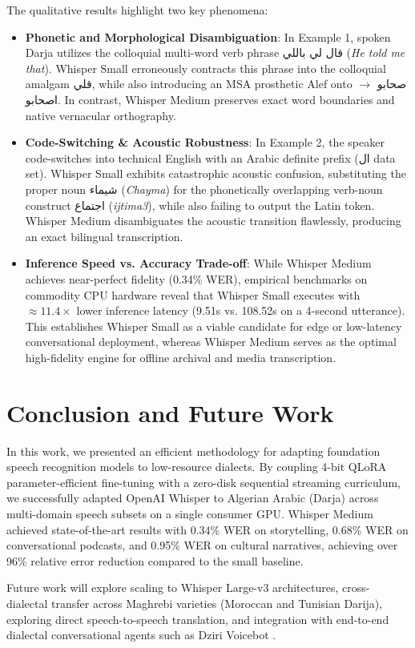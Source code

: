 \documentclass[11pt,a4paper]{article}
\providecommand{\textarabic}[1]{\foreignlanguage{arabic}{#1}}
\begin{document}
The qualitative results highlight two key phenomena:
\begin{itemize}[leftmargin=*]
    \item \textbf{Phonetic and Morphological Disambiguation}: In Example 1, spoken Darja utilizes the colloquial multi-word verb phrase \textarabic{قال لي باللي} (\textit{He told me that}). Whisper Small erroneously contracts this phrase into the colloquial amalgam \textarabic{قلي}, while also introducing an MSA prosthetic Alef onto \textarabic{صحابو} $\rightarrow$ \textarabic{اصحابو}. In contrast, Whisper Medium preserves exact word boundaries and native vernacular orthography.
    \item \textbf{Code-Switching \& Acoustic Robustness}: In Example 2, the speaker code-switches into technical English with an Arabic definite prefix (\textarabic{ال data set}). Whisper Small exhibits catastrophic acoustic confusion, substituting the proper noun \textarabic{شيماء} (\textit{Chayma}) for the phonetically overlapping verb-noun construct \textarabic{اجتماع} (\textit{ijtima3}), while also failing to output the Latin token. Whisper Medium disambiguates the acoustic transition flawlessly, producing an exact bilingual transcription.
    \item \textbf{Inference Speed vs. Accuracy Trade-off}: While Whisper Medium achieves near-perfect fidelity (0.34\% WER), empirical benchmarks on commodity CPU hardware reveal that Whisper Small executes with $\approx 11.4\times$ lower inference latency (9.51s vs. 108.52s on a 4-second utterance). This establishes Whisper Small as a viable candidate for edge or low-latency conversational deployment, whereas Whisper Medium serves as the optimal high-fidelity engine for offline archival and media transcription.
\end{itemize}

\FloatBarrier
\section{Conclusion and Future Work}
\label{sec:conclusion}

In this work, we presented an efficient methodology for adapting foundation speech recognition models to low-resource dialects. By coupling 4-bit QLoRA parameter-efficient fine-tuning with a zero-disk sequential streaming curriculum, we successfully adapted OpenAI Whisper to Algerian Arabic (Darja) across multi-domain speech subsets on a single consumer GPU. Whisper Medium achieved state-of-the-art results with 0.34\% WER on storytelling, 0.68\% WER on conversational podcasts, and 0.95\% WER on cultural narratives, achieving over 96\% relative error reduction compared to the small baseline.

Future work will explore scaling to Whisper Large-v3 architectures, cross-dialectal transfer across Maghrebi varieties (Moroccan and Tunisian Darija), exploring direct speech-to-speech translation, and integration with end-to-end dialectal conversational agents such as Dziri Voicebot \cite{lanasri2026dzirivoicebot}.

\FloatBarrier


\end{document}
